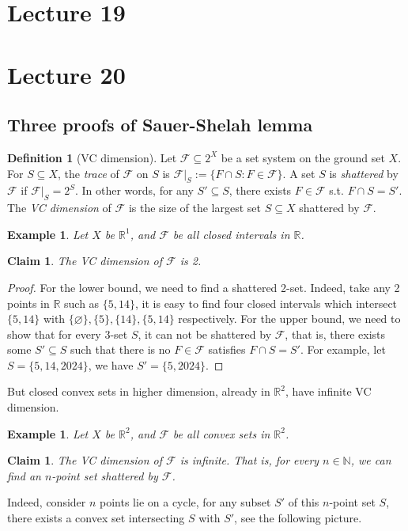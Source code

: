 \documentclass{article}
\newtheorem{claim}[theorem]{Claim}
\newtheorem{example}[theorem]{Example}
\theoremstyle{definition}
\newtheorem{definition}[theorem]{Definition}
\begin{document}
\newpage
\section{Lecture 19}



\newpage
\section{Lecture 20}

\subsection{Three proofs of Sauer-Shelah lemma}
\begin{definition}[VC dimension]
    Let $\mathcal{F} \subseteq 2^X$ be a set system on the ground set $X$. For $S \subseteq X$, the \emph{trace} of $\mathcal{F}$ on $S$ is $\mathcal{F}|_{S} := \{ F \cap S: F \in \mathcal{F} \}$. A set $S$ is \emph{shattered} by $\mathcal{F}$ if $\mathcal{F}|_{S} = 2^S$. In other words, for any $S' \subseteq S$, there exists $F \in \mathcal{F}$ s.t. $F\cap S = S'$. The \emph{VC dimension} of $\mathcal{F}$ is the size of the largest set $S \subseteq X$ shattered by $\mathcal{F}$.
\end{definition}

\begin{example}
Let $X$ be $\mathbb{R}^1$, and $\mathcal{F}$ be all closed intervals in $\mathbb{R}$.
\end{example}
\begin{claim}
    The VC dimension of $\mathcal{F}$ is 2. 
\end{claim}
\begin{proof}
    For the lower bound, we need to find a shattered 2-set. Indeed, take any 2 points in $\mathbb{R}$ such as $\{5,14\}$, it is easy to find four closed intervals which intersect $\{5,14\}$ with $\{\varnothing\},\{5\},\{14\},\{5,14\}$ respectively. For the upper bound, we need to show that for every 3-set $S$, it can not be shattered by $\mathcal{F}$, that is, there exists some $S'\subseteq S$ such that there is no $F \in \mathcal{F}$ satisfies $F\cap S=S'$. For example, let $S=\{5,14,2024\}$, we have $S'=\{5,2024\}$.
\end{proof}
But closed convex sets in higher dimension, already in $\mathbb{R}^2$, have infinite VC dimension.

\begin{example}
Let $X$ be $\mathbb{R}^2$, and $\mathcal{F}$ be all convex sets in $\mathbb{R}^2$.
\end{example}
\begin{claim}
    The VC dimension of $\mathcal{F}$ is infinite. That is, for every $n\in \mathbb{N}$, we can find an $n$-point set shattered by $\mathcal{F}$.
\end{claim}
Indeed, consider $n$ points lie on a cycle, for any subset $S'$ of this $n$-point set $S$, there exists a convex set intersecting $S$ with $S'$, see the following picture. 
\end{document}
